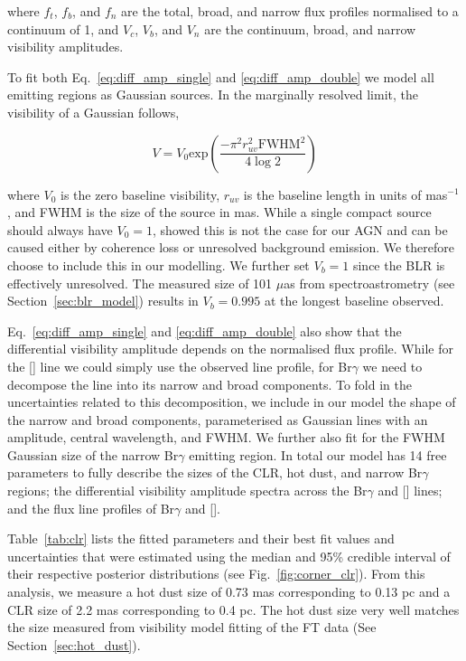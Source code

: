 \documentclass[longauth,]{aa}
\newcommand{\brg}{Br$\gamma$}
\newcommand{\caviii}{[\ion{Ca}{viii}]}
\newcommand{\uas}{{\mbox{$\mu$as}}}
\begin{document}
\noindent where $f_{t}$, $f_{b}$, and $f_{n}$ are the total, broad, and narrow flux profiles normalised to a continuum of 1, and $V_{c}$, $V_{b}$, and $V_{n}$ are the continuum, broad, and narrow visibility amplitudes. 

To fit both Eq.~\ref{eq:diff_amp_single} and \ref{eq:diff_amp_double} we model all emitting regions as Gaussian sources. In the marginally resolved limit, the visibility of a Gaussian follows,

\begin{equation}\label{eq:vis_gauss}
    V = V_0\mathrm{exp}\left(\frac{-\pi^2 r_{uv}^2 \mathrm{FWHM}^2}{4\log2}\right)
\end{equation}

\noindent where $V_0$ is the zero baseline visibility, $r_{uv}$ is the baseline length in units of mas$^{-1}$, and FWHM is the size of the source in mas. While a single compact source should always have $V_0=1$,  showed this is not the case for our AGN and can be caused either by coherence loss or unresolved background emission. We therefore choose to include this in our modelling. We further set $V_b=1$ since the BLR is effectively unresolved. The measured size of 101 \uas{} from spectroastrometry (see Section~\ref{sec:blr_model}) results in $V_b = 0.995$ at the longest baseline observed. 

Eq.~\ref{eq:diff_amp_single} and \ref{eq:diff_amp_double} also show that the differential visibility amplitude depends on the normalised flux profile. While for the \caviii{} line we could simply use the observed line profile, for \brg{} we need to decompose the line into its narrow and broad components. To fold in the uncertainties related to this decomposition, we include in our model the shape of the narrow and broad components, parameterised as Gaussian lines with an amplitude, central wavelength, and FWHM. We further also fit for the FWHM Gaussian size of the narrow \brg{} emitting region. In total our model has 14 free parameters to fully describe the sizes of the CLR, hot dust, and narrow \brg{} regions; the differential visibility amplitude spectra across the \brg{} and \caviii{} lines; and the flux line profiles of \brg{} and \caviii{}.



Table~\ref{tab:clr} lists the fitted parameters and their best fit values and uncertainties that were estimated using the median and 95\% credible interval of their respective posterior distributions (see Fig.~\ref{fig:corner_clr}). From this analysis, we measure a hot dust size of 0.73 mas corresponding to 0.13 pc and a CLR size of 2.2 mas corresponding to 0.4 pc. The hot dust size very well matches the size measured from visibility model fitting of the FT data (See Section~\ref{sec:hot_dust}). 
\end{document}
